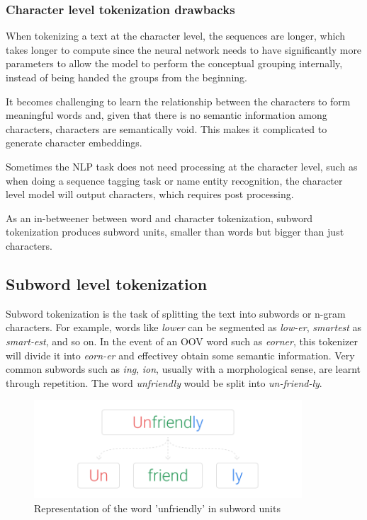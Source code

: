 \subsubsection{Character level tokenization drawbacks}

When tokenizing a text at the character level, the sequences are longer, which takes longer to compute since the neural network needs to have significantly more parameters to allow the model to perform the conceptual grouping internally, instead of being handed the groups from the beginning.

It becomes challenging to learn the relationship between the characters to form meaningful words and, given that there is no semantic information among characters, characters are semantically void. This makes it complicated to generate character embeddings.

Sometimes the NLP task does not need processing at the character level, such as when doing a sequence tagging task or name entity recognition, the character level model will output characters, which requires post processing.

As an in-betweener between word and character tokenization, subword tokenization produces subword units, smaller than words but bigger than just characters.

\subsection{Subword level tokenization}

Subword tokenization is the task of splitting the text into subwords or n-gram characters. For example, words like \emph{lower} can be segmented as \emph{low-er}, \emph{smartest} as \emph{smart-est}, and so on. In the event of an OOV word such as \emph{eorner}, this tokenizer will divide it into \emph{eorn-er} and effectivey obtain some semantic information. Very common subwords such as \emph{ing}, \emph{ion}, usually with a morphological sense, are learnt through repetition. The word \emph{unfriendly} would be split into \emph{un-friend-ly}.

\begin{figure}[!ht]
    \centering
    \includegraphics[width=10cm]{figures/subword.png}
    \caption{Representation of the word 'unfriendly' in subword units}
\end{figure}

